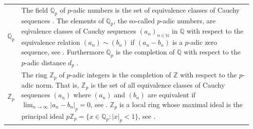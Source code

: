\documentclass[12pt]{amsart}
\theoremstyle{definition}
\begin{document}
{\begin{table}[H]
\begin{tabular}{|P{1.4cm} p{13.4cm}|}
		$\mathbb{Q}_p$ & The field $\mathbb{Q}_p$ of $p$-adic numbers is the set of equivalence classes of Cauchy sequences \cite[p.~10]{Ref_Koblitz_1984}. The elements of $\mathbb{Q}_p$, the so-called $p$-adic numbers, are eqivalence classes of Cauchy sequences $(a_n)_{n\in\mathbb{N}}$ in $\mathbb{Q}$ with respect to the equivalence relation $(a_n)\sim(b_n)$ if $(a_n-b_n)$ is a $p$-adic zero sequence, see \cite[p.~159]{Ref_Schmidt_2007}. Furthermore $\mathbb{Q}_p$ is the completion of $\mathbb{Q}$ with respect to the $p$-adic distance $d_p$ \cite[p.~159]{Ref_Schmidt_2007}. 
		\\
		$\mathbb{Z}_p$ & The ring $\mathbb{Z}_p$ of $p$-adic integers is the completion of $\mathbb{Z}$ with respect to the $p$-adic norm. That is, $\mathbb{Z}_p$ is the set of all equivalence classes of Cauchy sequences $(a_n)$ where $(a_n)$ and $(b_n)$ are equivalent if $\lim_{n\to\infty}|a_n-b_n|_p=0$, see \cite{Ref_Gupta_2018}. $\mathbb{Z}_p$ is a local ring whose maximal ideal is the principal ideal $p\mathbb{Z}_p=\{x\in\mathbb{Q}_p:|x|_p<1\}$, see \cite[p.~74]{Ref_Gouvea_2020}.
		\\ \hline
	\end{tabular}
\end{table}}



\vspace{1em}


\end{document}
